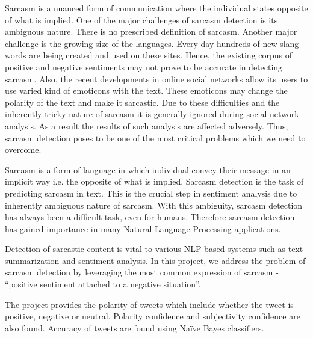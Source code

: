 \documentclass[oneside,a4paper,12pt]{book}
\begin{document}
{   \setlength{\parindent}{11mm} }
{ \setlength{\parindent}{10mm} Sarcasm is a nuanced form of communication where the individual states opposite of what is implied. One of the major challenges of sarcasm detection is its ambiguous nature. There is no prescribed definition of sarcasm. Another major challenge is the growing size of the languages. Every day hundreds of new slang words are being created and used on these sites. Hence, the existing corpus of positive and negative sentiments may not prove to be accurate in detecting sarcasm. Also, the recent developments in online social networks allow its users to use varied kind of emoticons with the text. These emoticons may change the polarity of the text and make it sarcastic. Due to these difficulties and the inherently tricky nature of sarcasm it is generally ignored during social network analysis. As a result the results of such analysis are affected adversely. Thus, sarcasm detection poses to be one of the most critical problems which we need to overcome. \vspace*{1.5\baselineskip}

\setlength{\parindent}{10mm}Sarcasm is a form of language in which individual convey their message in an implicit way i.e. the opposite of what is implied. Sarcasm detection is the task of predicting sarcasm in text. This is the crucial step in sentiment analysis due to inherently ambiguous nature of sarcasm. With this ambiguity, sarcasm detection has always been a difficult task, even for humans. Therefore sarcasm detection has gained importance in many Natural Language Processing applications.\vspace*{1.5\baselineskip}

\setlength{\parindent}{10mm}Detection of sarcastic content is vital to various NLP based systems such as text summarization and sentiment analysis. In this project, we address the problem of sarcasm detection by leveraging the most common expression of sarcasm - “positive sentiment attached to a negative situation”. \vspace*{1.5\baselineskip} 

\setlength{\parindent}{10mm} The project provides the polarity of tweets which include
whether the tweet is positive, negative or neutral. Polarity confidence and subjectivity confidence are also found. Accuracy of tweets are found using Naïve Bayes classifiers.\vspace*{1.5\baselineskip}}
\end{document}
